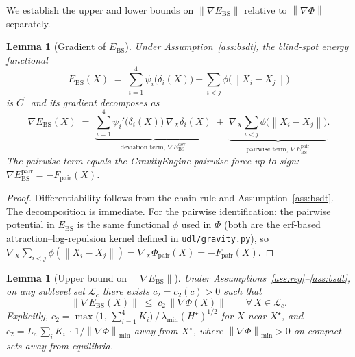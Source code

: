 \documentclass[11pt]{article}
\newtheorem{lemma}[theorem]{Lemma}
\theoremstyle{definition}
\newcommand{\Xst}{X^{\star}}
\newcommand{\grad}{\nabla}
\newcommand{\Ebs}{E_{\mathrm{BS}}}
\newcommand{\lmin}{\lambda_{\min}}
\newcommand{\norm}[1]{\left\|#1\right\|}
\begin{document}
We establish the upper and lower bounds on $\norm{\grad\Ebs}$ relative to
$\norm{\grad\Phi}$ separately.

\begin{lemma}[Gradient of $\Ebs$]
\label{lem:grad_ebs}
Under Assumption~\ref{ass:bsdt}, the blind-spot energy functional
\[
  \Ebs(X) \;=\; \sum_{i=1}^{4}\psi_i\bigl(\delta_i(X)\bigr)
              + \sum_{i < j}\phi\bigl(\norm{X_i - X_j}\bigr)
\]
is $C^1$ and its gradient decomposes as
\[
  \grad\Ebs(X)
  \;=\;
  \underbrace{\sum_{i=1}^{4}\psi_i'\bigl(\delta_i(X)\bigr)\,\grad_X\delta_i(X)}%
             _{\text{deviation term, }\grad\Ebs^{\mathrm{dev}}}
  \;+\;
  \underbrace{\grad_X\sum_{i<j}\phi\bigl(\norm{X_i-X_j}\bigr)}%
             _{\text{pairwise term, }\grad\Ebs^{\mathrm{pair}}}.
\]
The pairwise term equals the GravityEngine pairwise force up to sign:
$\grad\Ebs^{\mathrm{pair}} = -F_{\mathrm{pair}}(X)$.
\end{lemma}

\begin{proof}
Differentiability follows from the chain rule and Assumption~\ref{ass:bsdt}.
The decomposition is immediate.  For the pairwise identification: the pairwise
potential in $\Ebs$ is the same functional $\phi$ used in $\Phi$ (both are
the erf-based attraction--log-repulsion kernel defined in
\texttt{udl/gravity.py}), so
$\grad_X\sum_{i<j}\phi(\norm{X_i-X_j}) = \grad_X\Phi_{\mathrm{pair}}(X)
= -F_{\mathrm{pair}}(X)$.
\end{proof}

\begin{lemma}[Upper bound on $\norm{\grad\Ebs}$]
\label{lem:upper}
Under Assumptions~\ref{ass:reg}--\ref{ass:bsdt}, on any sublevel set
$\mathcal{L}_c$ there exists $c_2 = c_2(c) > 0$ such that
\[
  \norm{\grad\Ebs(X)} \;\le\; c_2\,\norm{\grad\Phi(X)}
  \qquad \forall\, X \in \mathcal{L}_c.
\]
Explicitly, $c_2 = \max\bigl(1,\, \sum_{i=1}^4 K_i\bigr)\, /\, \lmin(H^\star)^{1/2}$
for $X$ near $\Xst$, and $c_2 = L_c\,\sum_i K_i\,\cdot\,1/\norm{\grad\Phi}_{\min}$
away from $\Xst$, where $\norm{\grad\Phi}_{\min} > 0$ on compact sets away from
equilibria.
\end{lemma}
\end{document}

